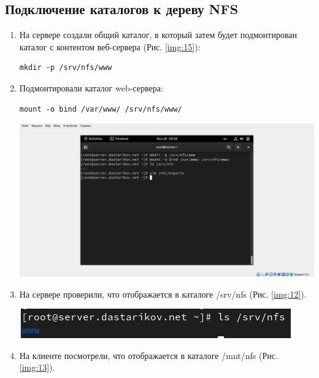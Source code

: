 \subsection{Подключение каталогов к дереву NFS}
\begin{enumerate}
    \item На сервере создали общий каталог, в который затем будет подмонтирован каталог с контентом веб-сервера (Рис. \ref{img:15}):
    \begin{verbatim}
mkdir -p /srv/nfs/www
    \end{verbatim}
\item Подмонтировали каталог web-сервера:
    \begin{verbatim}
mount -o bind /var/www/ /srv/nfs/www/
    \end{verbatim}

\begin{center}
    \centering
    \includegraphics[width=\textwidth]{../images/image15.png}
    \label{img:15}
\end{center}

\item На сервере проверили, что отображается в каталоге /srv/nfs (Рис. \ref{img:12}).

\begin{center}
    \centering
    \includegraphics[width=\textwidth]{../images/image12.png}
    \label{img:12}
\end{center}

\item На клиенте посмотрели, что отображается в каталоге /mnt/nfs (Рис. \ref{img:13}).


\end{enumerate}
